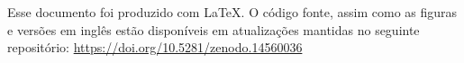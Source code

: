 \documentclass[./main.tex]{subfiles}
\begin{document}
\doublespacing %
\large

\newpage
\renewcommand{\headrulewidth}{0pt}
\thispagestyle{fancy}
\fancyhf{} %
\fancyfoot{} %
\fancyfoot[C]{\thepage}

\begin{center}
    \vspace{5mm}
\end{center}
\singlespacing
\normalsize

\setlength{\parskip}{\myparskip}

\par Esse documento foi produzido com \LaTeX. O código fonte, assim como as figuras e versões em inglês estão disponíveis em atualizações mantidas no seguinte repositório: \href{https://doi.org/10.5281/zenodo.14560036}{https://doi.org/10.5281/zenodo.14560036}


\clearpage
\end{document}
